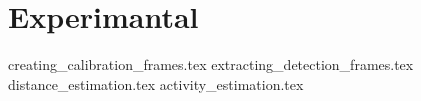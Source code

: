 \section{Experimantal}

{creating_calibration_frames.tex}
\clearpage
{extracting_detection_frames.tex}
\clearpage
{distance_estimation.tex}
\clearpage
{activity_estimation.tex}